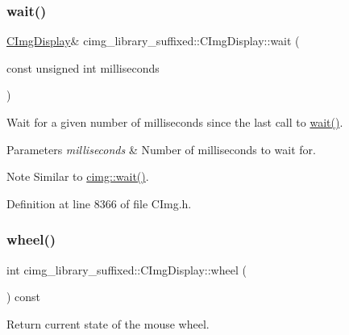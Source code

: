 \subsubsection{\texorpdfstring{wait()}{wait()}}
{\footnotesize\ttfamily \hyperlink{structcimg__library__suffixed_1_1CImgDisplay}{C\+Img\+Display}\& cimg\+\_\+library\+\_\+suffixed\+::\+C\+Img\+Display\+::wait (\begin{DoxyParamCaption}\item[{const unsigned int}]{milliseconds }\end{DoxyParamCaption})\hspace{0.3cm}{\ttfamily [inline]}}



Wait for a given number of milliseconds since the last call to \hyperlink{structcimg__library__suffixed_1_1CImgDisplay_a6ba54ea916f502d782ccb787ce02ccbd}{wait()}. 


\begin{DoxyParams}{Parameters}
{\em milliseconds} & Number of milliseconds to wait for. \\
\hline
\end{DoxyParams}
\begin{DoxyNote}{Note}
Similar to \hyperlink{namespacecimg__library__suffixed_1_1cimg_a8431f8cf0989f40df3b6ac7d9dc90abd}{cimg\+::wait()}. 
\end{DoxyNote}


Definition at line 8366 of file C\+Img.\+h.

\mbox{\label{structcimg__library__suffixed_1_1CImgDisplay_a652c48e6e55a89bc96c9ae24c99a828e}} 
\subsubsection{\texorpdfstring{wheel()}{wheel()}}
{\footnotesize\ttfamily int cimg\+\_\+library\+\_\+suffixed\+::\+C\+Img\+Display\+::wheel (\begin{DoxyParamCaption}{ }\end{DoxyParamCaption}) const\hspace{0.3cm}{\ttfamily [inline]}}



Return current state of the mouse wheel. 

